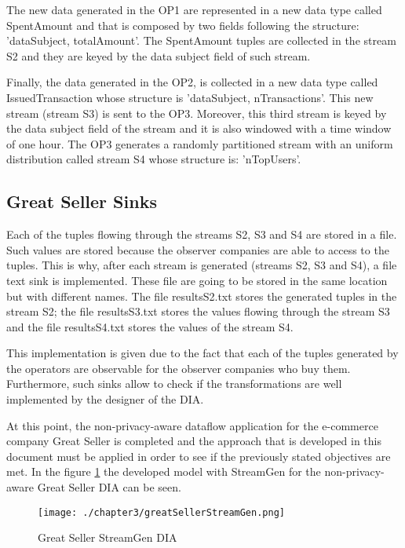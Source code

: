 The new data generated in the OP1 are represented in a new data type called SpentAmount and that is composed by two fields following the structure: 'dataSubject, totalAmount'. The SpentAmount tuples are collected in the stream S2 and they are keyed by the data subject field of such stream.

Finally, the data generated in the OP2, is collected in a new data type called IssuedTransaction whose structure is 'dataSubject, nTransactions'. This new stream (stream S3) is sent to the OP3. Moreover, this third stream is keyed by the data subject field of the stream and it is also windowed with a time window of one hour. The OP3 generates a randomly partitioned stream with an uniform distribution called stream S4 whose structure is: 'nTopUsers'.

\subsection{Great Seller Sinks}
Each of the tuples flowing through the streams S2, S3 and S4 are stored in a file. Such values are stored because the observer companies are able to access to the tuples. This is why, after each stream is generated (streams S2, S3 and S4), a file text sink is implemented. These file are going to be stored in the same location but with different names. The file resultsS2.txt stores the generated tuples in the stream S2; the file resultsS3.txt stores the values flowing through the stream S3 and the file resultsS4.txt stores the values of the stream S4.

This implementation is given due to the fact that each of the tuples generated by the operators are observable for the observer companies who buy them. Furthermore, such sinks allow to check if the transformations are well implemented by the designer of the DIA.

At this point, the non-privacy-aware dataflow application for the e-commerce company Great Seller is completed and the approach that is developed in this document must be applied in order to see if the previously stated objectives are met. In the figure \ref{fig:Great Seller StreamGen DIA} the developed model with StreamGen for the non-privacy-aware Great Seller DIA can be seen.

\begin{figure}
\centering
{\texttt{[image: ./chapter3/greatSellerStreamGen.png]}}
\caption{Great Seller StreamGen DIA}
\label{fig:Great Seller StreamGen DIA}
\end{figure}

